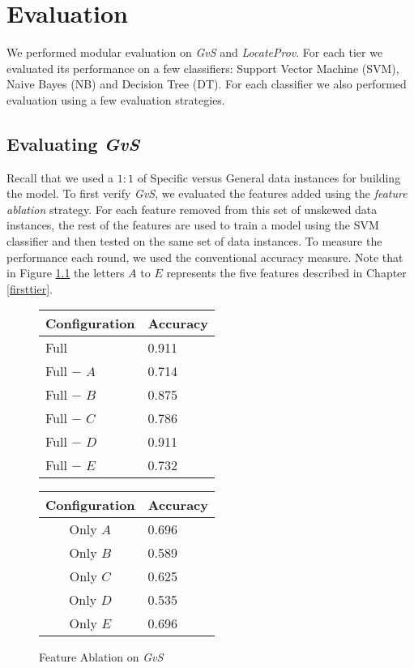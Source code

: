 \chapter{Evaluation}
\label{evaluation}
We performed modular evaluation on {\it GvS} and {\it LocateProv}. For each tier we evaluated its performance on a few classifiers: Support Vector Machine (SVM), Naive Bayes (NB) and Decision Tree (DT). For each classifier we also performed evaluation using a few evaluation strategies.

\section{Evaluating {\it GvS}}
\label{eval:first}
Recall that we used a $1:1$ of Specific versus General data instances for building the model. To first verify {\it GvS}, we evaluated the features added using the {\it feature ablation} strategy. For each feature removed from this set of unskewed data instances, the rest of the features are used to train a model using the SVM classifier and then tested on the same set of data instances. To measure the performance each round, we used the conventional accuracy measure. Note that in Figure \ref{fig:ablation_first} the letters $A$ to $E$ represents the five features described in Chapter \ref{firsttier}.

\begin{figure}[ht]
\begin{minipage}[b]{0.45\linewidth}\centering
\begin{tabular}{ l | l }
Configuration & Accuracy \\
\hline
Full			& 0.911 \\
Full $-$ $A$	& 0.714 \\
Full $-$ $B$	& 0.875 \\
Full $-$ $C$	& 0.786 \\
Full $-$ $D$	& 0.911 \\
Full $-$ $E$	& 0.732 \\
\end{tabular}
\end{minipage}
\hspace{0.5cm}
\begin{minipage}[b]{0.45\linewidth}\centering
\begin{tabular}{ c | l }
Configuration & Accuracy \\
\hline
Only $A$	& 0.696 \\
Only $B$	& 0.589 \\
Only $C$	& 0.625 \\
Only $D$	& 0.535 \\
Only $E$	& 0.696 \\
\end{tabular}
\end{minipage}
\caption{Feature Ablation on {\it GvS}}
\label{fig:ablation_first}
\end{figure}

